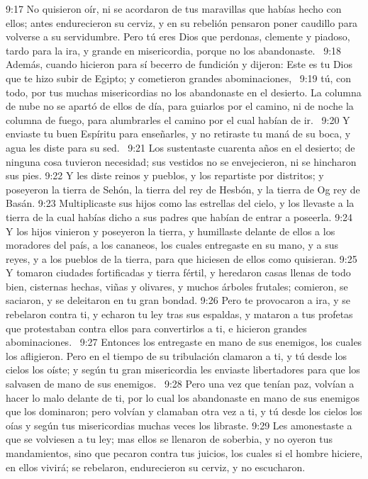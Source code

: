 9:17 No quisieron oír, ni se acordaron de tus maravillas que habías hecho con ellos; antes endurecieron su cerviz, y en su rebelión pensaron poner caudillo para volverse a su servidumbre. Pero tú eres Dios que perdonas, clemente y piadoso, tardo para la ira, y grande en misericordia, porque no los abandonaste.  
9:18 Además, cuando hicieron para sí becerro de fundición y dijeron: Este es tu Dios que te hizo subir de Egipto; y cometieron grandes abominaciones,  
9:19 tú, con todo, por tus muchas misericordias no los abandonaste en el desierto. La columna de nube no se apartó de ellos de día, para guiarlos por el camino, ni de noche la columna de fuego, para alumbrarles el camino por el cual habían de ir.  
9:20 Y enviaste tu buen Espíritu para enseñarles, y no retiraste tu maná de su boca, y agua les diste para su sed.  
9:21 Los sustentaste cuarenta años en el desierto; de ninguna cosa tuvieron necesidad; sus vestidos no se envejecieron, ni se hincharon sus pies. 
9:22 Y les diste reinos y pueblos, y los repartiste por distritos; y poseyeron la tierra de Sehón, la tierra del rey de Hesbón, y la tierra de Og rey de Basán. 
9:23 Multiplicaste sus hijos como las estrellas del cielo, y los llevaste a la tierra de la cual habías dicho a sus padres que habían de entrar a poseerla. 
9:24 Y los hijos vinieron y poseyeron la tierra, y humillaste delante de ellos a los moradores del país, a los cananeos, los cuales entregaste en su mano, y a sus reyes, y a los pueblos de la tierra, para que hiciesen de ellos como quisieran. 
9:25 Y tomaron ciudades fortificadas y tierra fértil, y heredaron casas llenas de todo bien, cisternas hechas, viñas y olivares, y muchos árboles frutales; comieron, se saciaron, y se deleitaron en tu gran bondad. 
9:26 Pero te provocaron a ira, y se rebelaron contra ti, y echaron tu ley tras sus espaldas, y mataron a tus profetas que protestaban contra ellos para convertirlos a ti, e hicieron grandes abominaciones.  
9:27 Entonces los entregaste en mano de sus enemigos, los cuales los afligieron. Pero en el tiempo de su tribulación clamaron a ti, y tú desde los cielos los oíste; y según tu gran misericordia les enviaste libertadores para que los salvasen de mano de sus enemigos.  
9:28 Pero una vez que tenían paz, volvían a hacer lo malo delante de ti, por lo cual los abandonaste en mano de sus enemigos que los dominaron; pero volvían y clamaban otra vez a ti, y tú desde los cielos los oías y según tus misericordias muchas veces los libraste. 
9:29 Les amonestaste a que se volviesen a tu ley; mas ellos se llenaron de soberbia, y no oyeron tus mandamientos, sino que pecaron contra tus juicios, los cuales si el hombre hiciere, en ellos vivirá; se rebelaron, endurecieron su cerviz, y no escucharon.  
